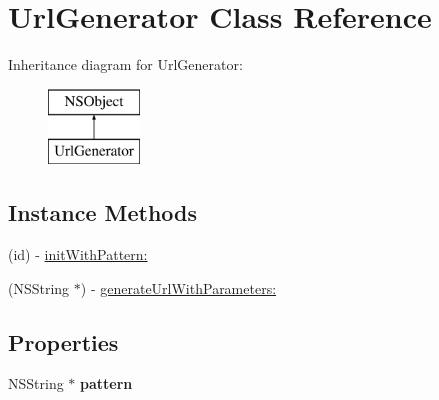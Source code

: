 \hypertarget{interface_url_generator}{\section{Url\-Generator Class Reference}
\label{interface_url_generator}
}
Inheritance diagram for Url\-Generator\-:\begin{figure}[H]
\begin{center}
\leavevmode
\includegraphics[height=2.000000cm]{interface_url_generator}
\end{center}
\end{figure}
\subsection*{Instance Methods}
\begin{DoxyCompactItemize}
\item 
(id) -\/ \hyperlink{interface_url_generator_a3a09ad3811017c7a885954d1e821fa61}{init\-With\-Pattern\-:}
\item 
(N\-S\-String $\ast$) -\/ \hyperlink{interface_url_generator_a6523008d6a855706d52c360cb3480161}{generate\-Url\-With\-Parameters\-:}
\end{DoxyCompactItemize}
\subsection*{Properties}
\begin{DoxyCompactItemize}
\item 
\hypertarget{interface_url_generator_a42612926206e7aee48cf90562a977678}{N\-S\-String $\ast$ {\bfseries pattern}}\label{interface_url_generator_a42612926206e7aee48cf90562a977678}

\end{DoxyCompactItemize}


